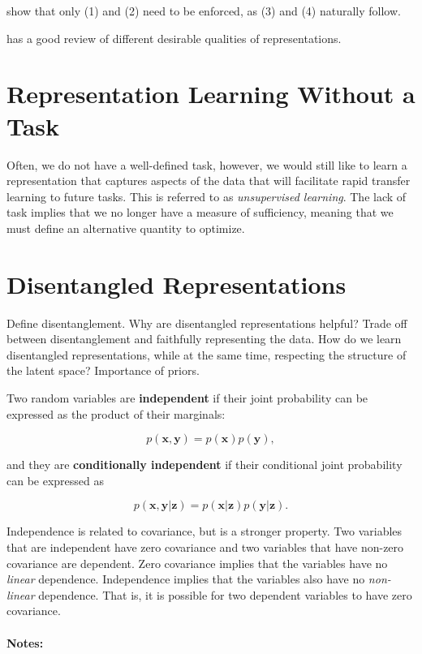 \noindent \cite{achille2017emergence} show that only (1) and (2) need to be enforced, as (3) and (4) naturally follow.


\cite{bengio2013representation} has a good review of different desirable qualities of representations.


\section{Representation Learning Without a Task}

Often, we do not have a well-defined task, however, we would still like to learn a representation that captures aspects of the data that will facilitate rapid transfer learning to future tasks. This is referred to as \textit{unsupervised learning}. The lack of task implies that we no longer have a measure of sufficiency, meaning that we must define an alternative quantity to optimize. 

\section{Disentangled Representations}

Define disentanglement. Why are disentangled representations helpful? Trade off between disentanglement and faithfully representing the data. How do we learn disentangled representations, while at the same time, respecting the structure of the latent space? Importance of priors.

Two random variables are \textbf{independent} if their joint probability can be expressed as the product of their marginals:

\begin{equation}
	p(\mathbf{x}, \mathbf{y}) = p(\mathbf{x}) p(\mathbf{y}),
\end{equation}

\noindent and they are \textbf{conditionally independent} if their conditional joint probability can be expressed as

\begin{equation}
	p(\mathbf{x}, \mathbf{y} | \mathbf{z}) = p(\mathbf{x} | \mathbf{z}) p(\mathbf{y} | \mathbf{z}).
\end{equation}

Independence is related to covariance, but is a stronger property. Two variables that are independent have zero covariance and two variables that have non-zero covariance are dependent. Zero covariance implies that the variables have no \textit{linear} dependence. Independence implies that the variables also have no \textit{non-linear} dependence. That is, it is possible for two dependent variables to have zero covariance. 
\\
\\
\noindent \textbf{Notes:}

